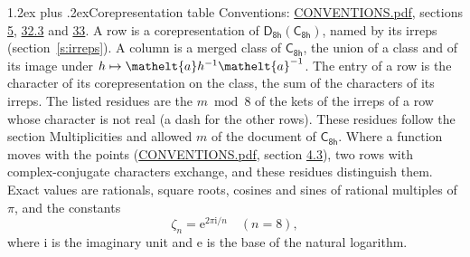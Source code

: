 \documentclass[10pt,a4paper]{article}
\makeatletter
\renewcommand\section{\@startsection{section}{1}{\z@}{-3ex plus -1ex minus -.2ex}%
  {1.2ex plus .2ex}{\normalfont\large\sffamily\bfseries\color{parttitle}}}
\numberwithin{equation}{section}
\newcommand{\eltfont}[1]{{\let\sigma\eltsigma\mathelt{#1}}}
\newcommand{\grp}[1]{\mathsf{#1}}
\newcommand{\elt}[1]{\eltfont{#1}}
\newcommand{\iunit}{\mathrm{i}}
\newcommand{\expe}{\mathrm{e}}
\newcommand{\rootunity}[1]{\zeta_{#1}}
\makeatother
\begin{document}
\section{Corepresentation table}\label{s:character_table}
Conventions: \href{../../CONVENTIONS.pdf}{CONVENTIONS.pdf}, sections \href{../../../rotation/CONVENTIONS.pdf\#conv.5}{5}, \href{../../CONVENTIONS.pdf\#conv.32.3}{32.3} and \href{../../CONVENTIONS.pdf\#conv.33}{33}.
A row is a corepresentation of $\grp{D_{8h}}(\grp{C_{8h}})$, named by its irreps (section~\ref{s:irreps}). A column is a merged class of $\grp{C_{8h}}$, the union of a class and of its image under $h \mapsto \elt{a} h^{-1} \elt{a}^{-1}$. The entry of a row is the character of its corepresentation on the class, the sum of the characters of its irreps.
\leavevmode\label{n:head.parity}The listed residues are the $m \bmod 8$ of the kets of the irreps of a row whose character is not real (a dash for the other rows). These residues follow the section Multiplicities and allowed $m$ of the document of \href{../../../rotation/data/pdf/C8h.pdf}{$\grp{C_{8h}}$}. Where a function moves with the points (\href{../../CONVENTIONS.pdf}{CONVENTIONS.pdf}, section \href{../../../rotation/CONVENTIONS.pdf\#conv.4.3}{4.3}), two rows with complex-conjugate characters exchange, and these residues distinguish them.
\leavevmode\label{n:constant.root}\label{n:index.root.order}Exact values are rationals, square roots, cosines and sines of rational multiples of $\pi$, and the constants
\begin{equation}\label{e:constants}\rootunity{n} = \expe^{2\pi\iunit/n}\quad(n = 8),\end{equation}
where $\iunit$ is the imaginary unit and $\expe$ is the base of the natural logarithm.
\end{document}
